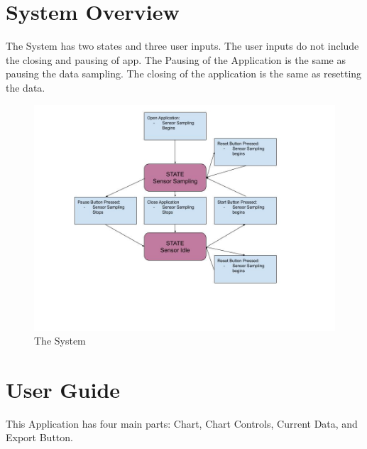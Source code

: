 \documentclass{article}
\begin{document}
\section{System Overview}
The System has two states and three user inputs. The user inputs do not include the closing and pausing of app. The Pausing of the Application is the same as pausing the data sampling. The closing of the application is the same as resetting the data. 
\begin{figure}[H]
\centering
\includegraphics[scale=.30]{system.jpg}
\caption{The System}
\label{fig:system}
\end{figure}

\section{User Guide}
This Application has four main parts: Chart, Chart Controls, Current Data, and Export Button. 
\end{document}
